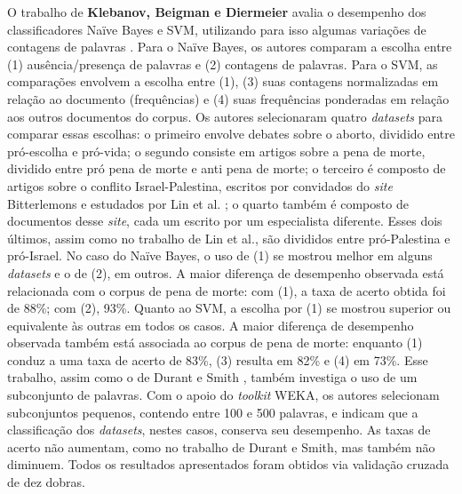 O trabalho de \textbf{Klebanov, Beigman e Diermeier} avalia o desempenho dos classificadores Naïve Bayes e SVM, utilizando para isso algumas variações de contagens de palavras \cite{klebanov}. Para o Naïve Bayes, os autores comparam a escolha entre (1) ausência/presença de palavras e (2) contagens de palavras. Para o SVM, as comparações envolvem a escolha entre (1), (3) suas contagens normalizadas em relação ao documento (frequências) e (4) suas frequências ponderadas em relação aos outros documentos do corpus. Os autores selecionaram quatro \emph{datasets} para comparar essas escolhas: o primeiro envolve debates sobre o aborto, dividido entre pró-escolha e pró-vida; o segundo consiste em artigos sobre a pena de morte, dividido entre pró pena de morte e anti pena de morte; o terceiro é composto de artigos sobre o conflito Israel-Palestina, escritos por convidados do \emph{site} Bitterlemons e estudados por Lin et al. \cite{lin-et-al2006}; o quarto também é composto de documentos desse \emph{site}, cada um escrito por um especialista diferente. Esses dois últimos, assim como no trabalho de Lin et al., são divididos entre pró-Palestina e pró-Israel.  No caso do Naïve Bayes, o uso de (1) se mostrou melhor em alguns \emph{datasets} e o de (2), em outros. A maior diferença de desempenho observada está relacionada com o corpus de pena de morte: com (1), a taxa de acerto obtida foi de 88\%; com (2), 93\%. Quanto ao SVM, a escolha por (1) se mostrou superior ou equivalente às outras em todos os casos.  A maior diferença de desempenho observada também está associada ao corpus de pena de morte: enquanto (1) conduz a uma taxa de acerto de 83\%, (3) resulta em 82\% e (4) em 73\%. Esse trabalho, assim como o de Durant e Smith \cite{durant-smith}, também investiga o uso de um subconjunto de palavras. Com o apoio do \emph{toolkit} WEKA, os autores selecionam subconjuntos pequenos, contendo entre 100 e 500 palavras, e indicam que a classificação dos \emph{datasets}, nestes casos, conserva seu desempenho. As taxas de acerto não aumentam, como no trabalho de Durant e Smith, mas também não diminuem. Todos os resultados apresentados foram obtidos via validação cruzada de dez dobras.





